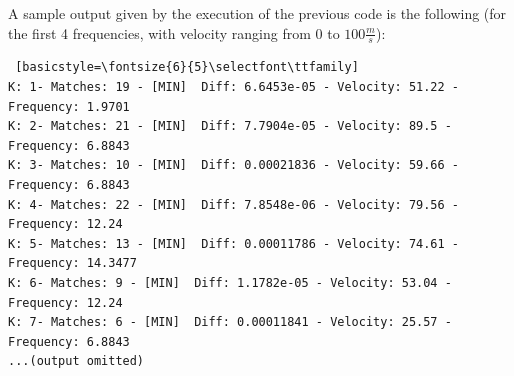 \documentclass[10pt,a4paper,final]{report}
\begin{document}
A sample output given by the execution of the previous code is the following (for the first 4 frequencies, with velocity ranging from  $0$ to $100 \frac{m}{s}$):
\begin{lstlisting} [basicstyle=\fontsize{6}{5}\selectfont\ttfamily]
K: 1- Matches: 19 - [MIN]  Diff: 6.6453e-05 - Velocity: 51.22 - Frequency: 1.9701
K: 2- Matches: 21 - [MIN]  Diff: 7.7904e-05 - Velocity: 89.5 - Frequency: 6.8843
K: 3- Matches: 10 - [MIN]  Diff: 0.00021836 - Velocity: 59.66 - Frequency: 6.8843
K: 4- Matches: 22 - [MIN]  Diff: 7.8548e-06 - Velocity: 79.56 - Frequency: 12.24
K: 5- Matches: 13 - [MIN]  Diff: 0.00011786 - Velocity: 74.61 - Frequency: 14.3477
K: 6- Matches: 9 - [MIN]  Diff: 1.1782e-05 - Velocity: 53.04 - Frequency: 12.24
K: 7- Matches: 6 - [MIN]  Diff: 0.00011841 - Velocity: 25.57 - Frequency: 6.8843
...(output omitted)
\end{lstlisting}
\end{document}
